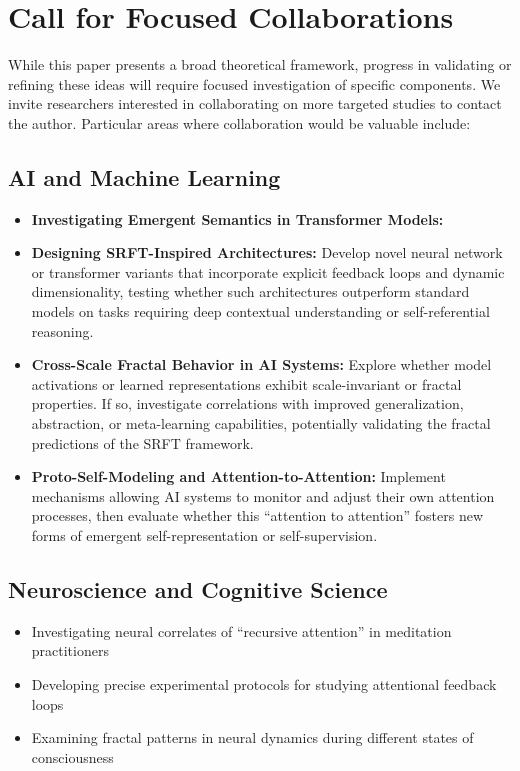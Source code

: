 \documentclass[12pt,a4paper]{article}
\begin{document}
\section{Call for Focused Collaborations}

While this paper presents a broad theoretical framework, progress in validating or refining these ideas will require focused investigation of specific components. We invite researchers interested in collaborating on more targeted studies to contact the author. Particular areas where collaboration would be valuable include:

\subsection*{AI and Machine Learning} 
\begin{itemize} 
\item \textbf{Investigating Emergent Semantics in Transformer Models:}

\item \textbf{Designing SRFT-Inspired Architectures:}  
Develop novel neural network or transformer variants that incorporate explicit feedback loops and dynamic dimensionality, testing whether such architectures outperform standard models on tasks requiring deep contextual understanding or self-referential reasoning.

\item \textbf{Cross-Scale Fractal Behavior in AI Systems:}  
Explore whether model activations or learned representations exhibit scale-invariant or fractal properties. If so, investigate correlations with improved generalization, abstraction, or meta-learning capabilities, potentially validating the fractal predictions of the SRFT framework.

\item \textbf{Proto-Self-Modeling and Attention-to-Attention:}  
Implement mechanisms allowing AI systems to monitor and adjust their own attention processes, then evaluate whether this “attention to attention” fosters new forms of emergent self-representation or self-supervision.
\end{itemize}


\subsection*{Neuroscience and Cognitive Science}
\begin{itemize}
    \item Investigating neural correlates of ``recursive attention'' in meditation practitioners
    \item Developing precise experimental protocols for studying attentional feedback loops
    \item Examining fractal patterns in neural dynamics during different states of consciousness
\end{itemize}
\end{document}
